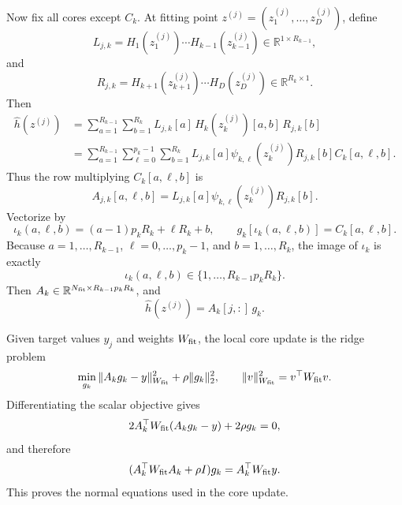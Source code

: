 \documentclass[11pt]{article}
\numberwithin{equation}{section}
\begin{document}
Now fix all cores except \(C_k\).  At fitting point
\(z^{(j)}=(z_1^{(j)},\ldots,z_D^{(j)})\), define
\begin{equation}
    L_{j,k}
    =
    H_1(z_1^{(j)})\cdots H_{k-1}(z_{k-1}^{(j)})
    \in\mathbb R^{1\times R_{k-1}},
    \label{eq:p33-left-env}
\end{equation}
and
\begin{equation}
    R_{j,k}
    =
    H_{k+1}(z_{k+1}^{(j)})\cdots H_D(z_D^{(j)})
    \in\mathbb R^{R_k\times1}.
    \label{eq:p33-right-env}
\end{equation}
Then
\begin{equation}
\begin{aligned}
    \widehat h(z^{(j)})
    &=
    \sum_{a=1}^{R_{k-1}}\sum_{b=1}^{R_k}
    L_{j,k}[a]\,H_k(z_k^{(j)})[a,b]\,R_{j,k}[b]\\
    &=
    \sum_{a=1}^{R_{k-1}}
    \sum_{\ell=0}^{p_k-1}
    \sum_{b=1}^{R_k}
    L_{j,k}[a]\psi_{k,\ell}(z_k^{(j)})R_{j,k}[b]
    C_k[a,\ell,b].
\end{aligned}
    \label{eq:p33-row-derivation}
\end{equation}
Thus the row multiplying \(C_k[a,\ell,b]\) is
\begin{equation}
    A_{j,k}[a,\ell,b]
    =
    L_{j,k}[a]\psi_{k,\ell}(z_k^{(j)})R_{j,k}[b].
    \label{eq:p33-ls-row}
\end{equation}
Vectorize by
\begin{equation}
    \iota_k(a,\ell,b)
    =
    (a-1)p_kR_k+\ell R_k+b,
    \qquad
    g_k[\iota_k(a,\ell,b)]=C_k[a,\ell,b].
    \label{eq:p33-vectorization}
\end{equation}
Because \(a=1,\ldots,R_{k-1}\), \(\ell=0,\ldots,p_k-1\), and
\(b=1,\ldots,R_k\), the image of \(\iota_k\) is exactly
\begin{equation}
    \iota_k(a,\ell,b)\in\{1,\ldots,R_{k-1}p_kR_k\}.
    \label{eq:p33-vectorization-range}
\end{equation}
Then \(A_k\in\mathbb R^{N_{\rm fit}\times R_{k-1}p_kR_k}\), and
\begin{equation}
    \widehat h(z^{(j)})=A_k[j,:]\,g_k.
    \label{eq:p33-ls-linear}
\end{equation}

Given target values \(y_j\) and weights \(W_{\rm fit}\), the local core update
is the ridge problem
\begin{equation}
    \min_{g_k}
    \|A_kg_k-y\|_{W_{\rm fit}}^2+\rho\|g_k\|_2^2,
    \qquad
    \|v\|_{W_{\rm fit}}^2=v^\top W_{\rm fit}v.
    \label{eq:p33-ridge-objective}
\end{equation}
Differentiating the scalar objective gives
\begin{equation}
    2A_k^\top W_{\rm fit}(A_kg_k-y)+2\rho g_k=0,
    \label{eq:p33-ridge-gradient}
\end{equation}
and therefore
\begin{equation}
    (A_k^\top W_{\rm fit}A_k+\rho I)g_k
    =
    A_k^\top W_{\rm fit}y.
    \label{eq:p33-normal-equation}
\end{equation}
This proves the normal equations used in the core update.
\end{document}
